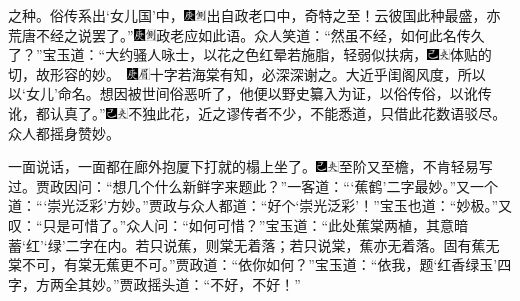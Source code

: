 之种。俗传系出‘女儿国’中，{\includegraphics[width=3mm]{../Images/00004}\includegraphics[width=3mm]{../Images/00011}\footnotesize \kaishu 出自政老口中，奇特之至！}云彼国此种最盛，亦荒唐不经之说罢了。”{\includegraphics[width=3mm]{../Images/00004}\includegraphics[width=3mm]{../Images/00011}\footnotesize \kaishu 政老应如此语。}众人笑道：“然虽不经，如何此名传久了？”宝玉道：“大约骚人咏士，以花之色红晕若施脂，轻弱似扶病，{\includegraphics[width=3mm]{../Images/00003}\includegraphics[width=3mm]{../Images/00012}\footnotesize \kaishu 体贴的切，故形容的妙。　{\includegraphics[width=3mm]{../Images/00004}\includegraphics[width=3mm]{../Images/00010}\footnotesize \kaishu 十字若海棠有知，必深深谢之。}}大近乎闺阁风度，所以以‘女儿’命名。想因被世间俗恶听了，他便以野史纂入为证，以俗传俗，以讹传讹，都认真了。”{\includegraphics[width=3mm]{../Images/00003}\includegraphics[width=3mm]{../Images/00012}\footnotesize \kaishu 不独此花，近之谬传者不少，不能悉道，只借此花数语驳尽。}众人都摇身赞妙。

一面说话，一面都在廊外抱厦下打就的榻上坐了。{\includegraphics[width=3mm]{../Images/00003}\includegraphics[width=3mm]{../Images/00012}\footnotesize \kaishu 至阶又至檐，不肯轻易写过。}贾政因问：“想几个什么新鲜字来题此？”一客道：“‘蕉鹤’二字最妙。”又一个道：“‘崇光泛彩’方妙。”贾政与众人都道：“好个‘崇光泛彩’！”宝玉也道：“妙极。”又叹：“只是可惜了。”众人问：“如何可惜？”宝玉道：“此处蕉棠两植，其意暗蓄‘红’‘绿’二字在内。若只说蕉，则棠无着落；若只说棠，蕉亦无着落。固有蕉无棠不可，有棠无蕉更不可。”贾政道：“依你如何？”宝玉道：“依我，题‘红香绿玉’四字，方两全其妙。”贾政摇头道：“不好，不好！”

